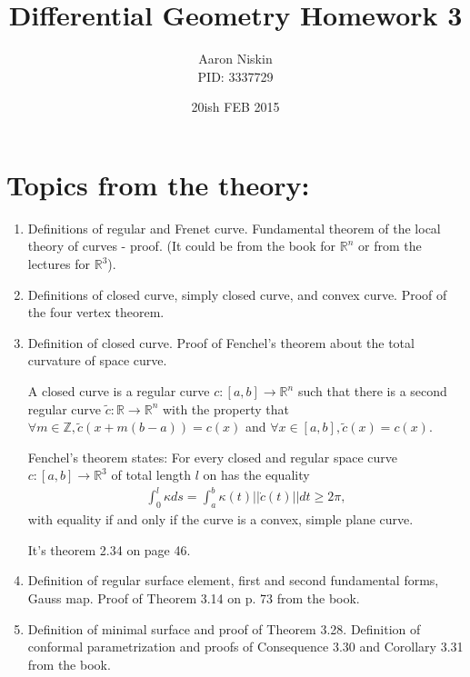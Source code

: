\documentclass[12pt]{amsart}
\newcommand{\q}[1]{\item #1}
\begin{document}
\title{Differential Geometry Homework 3}
\author{Aaron Niskin \\PID: 3337729}
\date{20ish FEB 2015}
\maketitle

\section{Topics from the theory:}
\begin{enumerate}

\q{Definitions of regular and Frenet curve. Fundamental theorem of the local theory of curves - proof. (It could be from the book for $\mathbb{R}^n$ or from the lectures for $\mathbb{R}^3$).}

\newpage
\q{Definitions of closed curve, simply closed curve, and convex curve. Proof of the four vertex theorem.}

\newpage
\q{Definition of closed curve. Proof of Fenchel's theorem about the total curvature of space curve.}
\par A closed curve is a regular curve $c:[a,b]\to\mathbb{R}^n$ such that there is a second regular curve $\tilde c:\mathbb{R}\to\mathbb{R}^n$ with the property that $\forall m\in\mathbb{Z}, \tilde c(x+m(b-a))=c(x)$ and $\forall x\in[a,b],\tilde c(x)=c(x)$.
\par Fenchel's theorem states: For every closed and regular space curve $c:[a,b]\to\mathbb{R}^3$ of total length $l$ on has the equality
\begin{align*}
	\int_0^l\kappa ds=\int_a^b\kappa(t)||\dot c(t)||dt\geq2\pi,
\end{align*}
with equality if and only if the curve is a convex, simple plane curve.
\par It's theorem 2.34 on page 46.

\newpage
\q{Definition of regular surface element, first and second fundamental forms, Gauss map. Proof of Theorem 3.14 on p. 73 from the book.}

\newpage
\q{Definition of minimal surface and proof of Theorem 3.28. Definition of conformal parametrization and proofs of Consequence 3.30 and Corollary 3.31 from the book.}


\end{enumerate}
\end{document}
